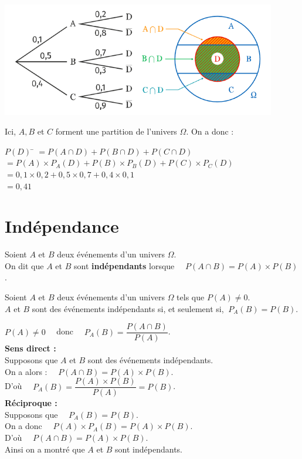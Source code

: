 \documentclass[a4paper,11pt,cours]{nsi} %
\begin{document}
\begin{exemple}[ ]
	\begin{center}
		\includegraphics[width=12cm]{exemple}
	\end{center}
Ici, $A,B$ et $C$ forment une partition de l'univers $\Omega$. On a donc :
\begin{tabbing}
	$P(D)$ \= $=P(A\cap D)+P(B\cap D)+P(C\cap D)$\\
	\>	$=P(A)\times P_A(D)+P(B)\times P_B(D)+P(C)\times P_C(D)$\\
	\>	$=0,1 \times 0,2 + 0,5 \times 0,7 + 0,4 \times 0,1$\\
	\>	$=0,41$
\end{tabbing}
\end{exemple}

\section{Indépendance}
\begin{definition}[ ]
	Soient $A$ et $B$ deux événements d'un univers $\Omega$.\\
	On dit que $A$ et $B$ sont \textbf{indépendants} lorsque $\quad P(A\cap B)=P(A)\times P(B)$.
\end{definition}

\begin{propriete}[ ]
	Soient $A$ et $B$ deux événements d'un univers $\Omega$ tels que $P(A)\neq 0$.\\
	$A$ et $B$ sont des événements indépendants si, et seulement si, $\ P_A(B)=P(B)$.
\end{propriete}

\begin{demonstration}
	$P(A)\neq 0 \quad$ donc $\quad P_A(B)=\dfrac{P(A\cap B)}{P(A)}$.\\
	\textbf{Sens direct :}\\
	Supposons que $A$ et $B$ sont des événements indépendants.\\
	On a alors : $\quad P(A\cap B)=P(A)\times P(B)$.\\[0.5em]
	D'où $\quad P_A(B)=\dfrac{P(A)\times P(B)}{P(A)}=P(B)$.\\[0.5em]
	\textbf{Réciproque :}\\
	Supposons que $\quad P_A(B)=P(B)$.\\
	On a donc $\quad P(A)\times P_A(B)=P(A)\times P(B)$.\\
	D'où $\quad P(A\cap B)=P(A)\times P(B)$.\\
	Ainsi on a montré que $A$ et $B$ sont indépendants.
\end{demonstration}
\end{document}
